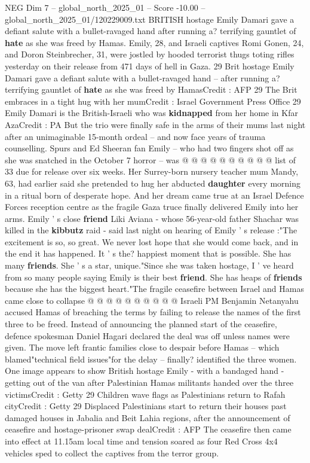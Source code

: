 \begin{textsample}{NEG Dim 7 – global\_north\_2025\_01 – Score -10.00 – global\_north\_2025\_01/120229009.txt}  \label{ex:f7_neg_056}
BRITISH hostage Emily Damari gave a defiant salute with a bullet-ravaged hand after running a? terrifying gauntlet of \textbf{hate} as she was freed by Hamas.
Emily, 28, and Israeli captives Romi Gonen, 24, and Doron Steinbrecher, 31, were jostled by hooded terrorist thugs toting rifles yesterday on their release from 471 days of hell in Gaza. 29 Brit hostage Emily Damari gave a defiant salute with a bullet-ravaged hand -- after running a? terrifying gauntlet of \textbf{hate} as she was freed by HamasCredit : AFP 29 The Brit embraces in a tight hug with her mumCredit : Israel Government Press Office 29 Emily Damari is the British-Israeli who was \textbf{kidnapped} from her home in Kfar AzaCredit : PA But the trio were finally safe in the arms of their mums last night after an unimaginable 15-month ordeal -- and now face years of trauma counselling.
Spurs and Ed Sheeran fan Emily -- who had two fingers shot off as she was snatched in the October 7 horror -- was @ @ @ @ @ @ @ @ @ @ list of 33 due for release over six weeks.
Her Surrey-born nursery teacher mum Mandy, 63, had earlier said she pretended to hug her abducted \textbf{daughter} every morning in a ritual born of desperate hope.
And her dream came true at an Israel Defence Forces reception centre as the fragile Gaza truce finally delivered Emily into her arms.
Emily ' s close \textbf{friend} Liki Aviana - whose 56-year-old father Shachar was killed in the \textbf{kibbutz} raid - said last night on hearing of Emily ' s release :"The excitement is so, so great.
We never lost hope that she would come back, and in the end it has happened.
It ' s the? happiest moment that is possible.
She has many \textbf{friends}.
She ' s a star, unique."Since she was taken hostage, I ' ve heard from so many people saying Emily is their best \textbf{friend}.
She has heaps of \textbf{friends} because she has the biggest heart."The fragile ceasefire between Israel and Hamas came close to collapse @ @ @ @ @ @ @ @ @ @ Israeli PM Benjamin Netanyahu accused Hamas of breaching the terms by failing to release the names of the first three to be freed.
Instead of announcing the planned start of the ceasefire, defence spokesman Daniel Hagari declared the deal was off unless names were given.
The move left frantic families close to despair before Hamas -- which blamed"technical field issues"for the delay -- finally? identified the three women.
One image appears to show British hostage Emily - with a bandaged hand - getting out of the van after Palestinian Hamas militants handed over the three victimsCredit : Getty 29 Children wave flags as Palestinians return to Rafah cityCredit : Getty 29 Displaced Palestinians start to return their houses past damaged houses in Jabalia and Beit Lahia regions, after the announcement of ceasefire and hostage-prisoner swap dealCredit : AFP The ceasefire then came into effect at 11.15am local time and tension soared as four Red Cross 4x4 vehicles sped to collect the captives from the terror group.

\end{textsample}
